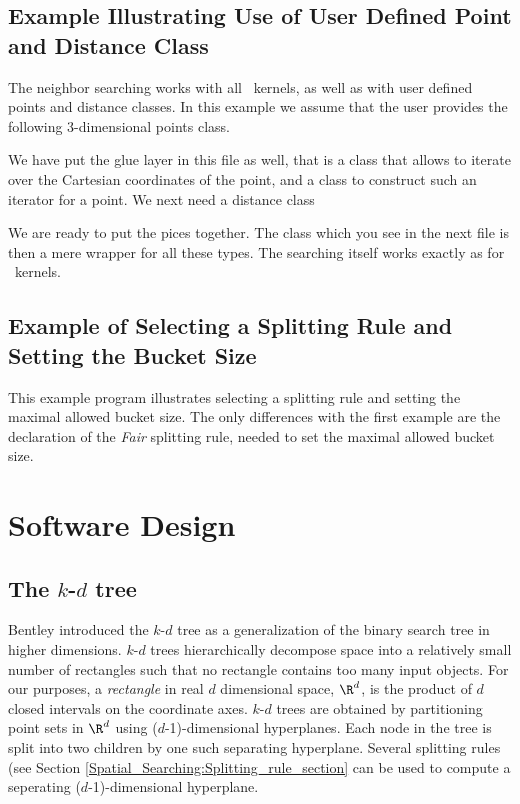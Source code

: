 \newpage
\subsection{Example Illustrating Use of User Defined Point and Distance Class}

The neighbor searching works with all \cgal\ kernels, as well as with
user defined points and distance classes.
In this example we assume that the user provides the following 3-dimensional 
points class.


We have put the glue layer in this file as well, that is a class that allows to 
iterate over the Cartesian coordinates of the point, and a class to construct
such an iterator for a point. We next need a distance class
\newpage
{}

\newpage

We are ready to put the pices together.
The class  which you see in the next file is then a mere 
wrapper for all these types.  The searching itself works exactly as for \cgal\ kernels.


\newpage
\subsection{Example of Selecting a Splitting Rule and Setting the Bucket Size}

This example program illustrates selecting a splitting rule and
setting the maximal allowed bucket size.  The only differences with
the first example are the declaration of the {\em Fair} 
splitting rule, needed to set the maximal allowed bucket size.


\newpage

\section{Software Design}

\subsection{The $k$-$d$ tree}
\label{Kd_tree_subsection}

Bentley \cite{b-mbstu-75} introduced the $k$-$d$ tree as a
generalization of the binary search tree in higher dimensions. $k$-$d$
trees hierarchically decompose space into a relatively small number of
rectangles such that no rectangle contains too many input objects.
For our purposes, a {\it rectangle} in real $d$ dimensional space,
$\R^d$, is the product of $d$ closed intervals on the coordinate axes.
$k$-$d$ trees are obtained by partitioning point sets in $\R^d$ using
($d$-1)-dimensional hyperplanes.  Each node in the tree is split into
two children by one such separating hyperplane.  Several splitting
rules (see Section \ref{Spatial_Searching:Splitting_rule_section} can
be used to compute a seperating ($d$-1)-dimensional hyperplane.

